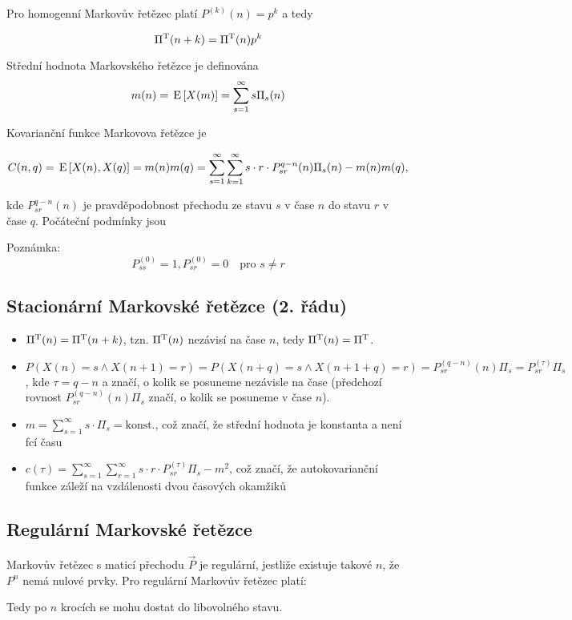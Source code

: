 Pro homogenní Markovův řetězec platí $P^{(k)}(n)=p^k$ a tedy

\[ \Pi^{\mathrm{T}}(n+k) = \Pi^{\mathrm{T}}(n)p^k \]

Střední hodnota Markovského řetězce je definována
\[ m(n) = \,\mathrm{E}\left[X(m)\right]=\sum_{s=1}^\infty s\Pi_s(n) \]

Kovarianční funkce Markovova řetězce je

\[ C(n,q)=\,\mathrm{E}\left[X(n),X(q)\right]=m(n)m(q)=\sum_{s=1}^\infty\sum_{k=1}^\infty s\cdot r\cdot P_{sr}^{q-n}(n)\Pi_s(n)-m(n)m(q), \]

kde $P_{sr}^{q-n}(n)$ je pravděpodobnost přechodu ze stavu $s$ v čase $n$ do stavu $r$ v čase $q$. Počáteční podmínky jsou

Poznámka:
\[ P_{ss}^{(0)}=1, P_{sr}^{(0)}=0\quad\text{pro } s\neq r \]

\subsection{Stacionární Markovské řetězce (2. řádu)}

\begin{itemize}
\item $\Pi^{\mathrm{T}}(n)=\Pi^{\mathrm{T}}(n+k)$, tzn. $\Pi^{\mathrm{T}}(n)$ nezávisí na čase $n$, tedy $\Pi^{\mathrm{T}}(n)=\Pi^{\mathrm{T}}$.
\item $P(X(n)=s \wedge X(n+1)=r)=P(X(n+q)=s \wedge X(n+1+q)=r)=P_{sr}^{(q-n)}(n)\Pi_s=P_{sr}^{(\tau)}\Pi_s$, kde $\tau = q-n$ a značí, o kolik se posuneme nezávisle na čase (předchozí rovnost $P_{sr}^{(q-n)}(n)\Pi_s$ značí, o kolik se posuneme v čase $n$).
\item $m=\displaystyle\sum_{s=1}^\infty s\cdot\Pi_s=\text{konst.}$, což značí, že střední hodnota je konstanta a není fcí času
\item $c(\tau)=\sum_{s=1}^\infty\sum_{r=1}^\infty s\cdot r\cdot P_{sr}^{(\tau)}\Pi_s-m^2$, což značí, že autokovarianční funkce záleží na vzdálenosti dvou časových okamžiků
\end{itemize}

\subsection{Regulární Markovské řetězce}
Markovův řetězec s maticí přechodu $\vec{P}$ je regulární, jestliže existuje takové $n$, že $P^n$ nemá nulové prvky. Pro regulární Markovův řetězec platí:

Tedy po $n$ krocích se mohu dostat do libovolného stavu.

